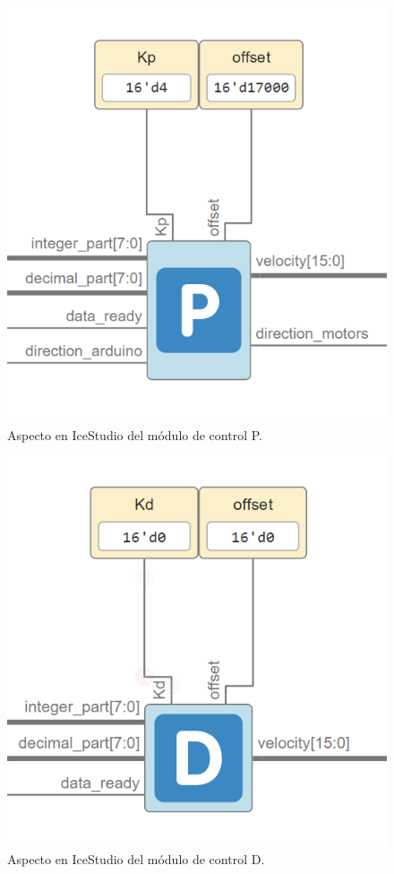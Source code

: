 	\begin{figure}[H]
	\center
	\includegraphics[scale=0.5]{imagenes/Balancing_robot/Pcontrol}
	\caption{Aspecto en IceStudio del módulo de control P.}
	\label{fig:Pcontrol}
\end{figure}

\begin{figure}[H]
	\center
	\includegraphics[scale=0.5]{imagenes/Balancing_robot/Dcontrol}
	\caption{Aspecto en IceStudio del módulo de control D.}
	\label{fig:Dcontrol}
\end{figure}

